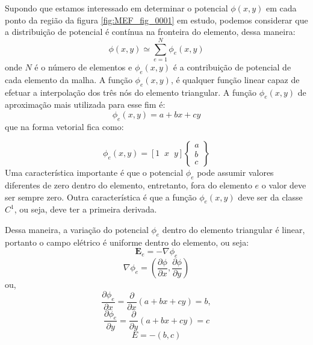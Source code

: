 \documentclass[
12pt,
a4paper,
oneside,
chapter=TITLE,
sumario=tradicional
]{abntex2}
\begin{document}
	Supondo que estamos interessado em determinar o potencial $\phi(x,y)$ em cada ponto da região da figura \ref{fig:MEF_fig_0001} em estudo,  podemos considerar que a distribuição de potencial é contínua na fronteira do elemento, dessa maneira:
	\begin{equation}
	\phi(x,y) \simeq \sum_{e=1}^{N} \phi_e(x,y) 
	\end{equation}
	onde $N$ é o número de elementos e $\phi_e(x,y)$ é a contribuição de potencial de cada elemento da malha. A função $\phi_e(x,y)$, é qualquer função linear capaz de efetuar a interpolação dos três nós do elemento triangular. A função $\phi_e(x,y)$ de aproximação mais utilizada para esse fim é:
	\begin{equation}
	\phi_e(x,y) = a + bx + cy 
	\end{equation}
	que na forma vetorial fica como:
    
    \begin{equation}
    \phi_e(x,y) = [1 \;\; x \;\; y] 
    \begin{Bmatrix}
    	a \\
    	b \\
    	c
    \end{Bmatrix}
    \label{eq:MEF_eq_0001} 
	\end{equation}
    Uma característica importante é que o potencial $\phi_e$ pode assumir valores diferentes de zero dentro do elemento, entretanto, fora do elemento $e$ o valor deve ser sempre zero. Outra característica é que a  função $\phi_e(x,y)$ deve ser da classe  $C^1$, ou seja, deve ter a primeira derivada. 
    
    Dessa maneira, a variação do potencial $\phi_e$ dentro do elemento triangular é linear, portanto o campo elétrico é uniforme dentro do elemento, ou seja:
    \begin{equation}
    \mathbf{E}_e = - \nabla \phi_e 
	\end{equation}
    \begin{equation}
    \nabla \phi_e = \left( \frac{\partial \phi}{\partial x}, \frac{\partial \phi}{\partial y} \right) 
	\end{equation}
    ou,
    \begin{equation*}
    \frac{\partial \phi_e}{\partial x} = \frac{\partial}{\partial x}(a + bx + cy) = b,
	\end{equation*}
    \begin{equation*}
    \frac{\partial \phi_e}{\partial y} = \frac{\partial}{\partial y}(a + bx + cy) = c
	\end{equation*}
    \begin{equation*}
    E = -(b, c) 
	\end{equation*}
    
\end{document}
